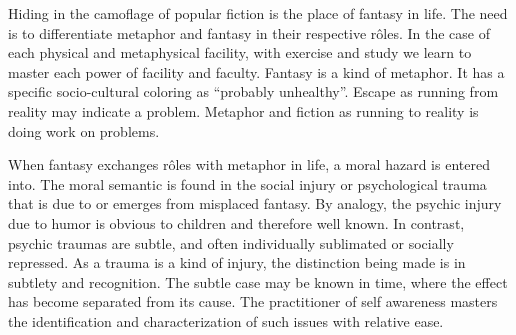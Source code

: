 

Hiding in the camoflage of popular fiction is the place of fantasy in
life.  The need is to differentiate metaphor and fantasy in their
respective r\^oles.  In the case of each physical and metaphysical
facility, with exercise and study we learn to master each power of
facility and faculty.  Fantasy is a kind of metaphor.  It has a
specific socio-cultural coloring as ``probably unhealthy''.  Escape as
running from reality may indicate a problem.  Metaphor and fiction as
running to reality is doing work on problems.

When fantasy exchanges r\^oles with metaphor in life, a moral hazard
is entered into.  The moral semantic is found in the social injury or
psychological trauma that is due to or emerges from misplaced fantasy.
By analogy, the psychic injury due to humor is obvious to children and
therefore well known.  In contrast, psychic traumas are subtle, and
often individually sublimated or socially repressed.  As a trauma is a
kind of injury, the distinction being made is in subtlety and
recognition.  The subtle case may be known in time, where the effect
has become separated from its cause.  The practitioner of self
awareness masters the identification and characterization of such
issues with relative ease.

\bye
